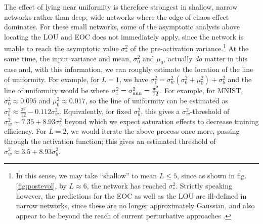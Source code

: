 The effect of lying near uniformity is therefore strongest in shallow, narrow networks rather than deep, wide networks where the edge of chaos effect dominates. For these small networks, some of the asymptotic analysis above locating the LOU and EOC does not immediately apply, since the network is unable to reach the asymptotic value $\sigma_{*}^{2}$ of the pre-activation variance.\footnote{In this sense, we may take ``shallow'' to mean $L \leq 5$, since as shown in fig. \ref{fig:postevol}, by $L \approx 6$, the network has reached $\sigma_{*}^{2}$. Strictly speaking however, the predictions for the EOC as well as the LOU are ill-defined in narrow networks, since these are no longer approximately Gaussian, and also appear to be beyond the reach of current perturbative approaches \cite{Grosvenor:2021eol}.} At the same time, the input variance and mean, $\sigma_{0}^{2}$ and $\mu_0$, actually \emph{do} matter in this case and, with this information, we can roughly estimate the location of the line of uniformity. For example, for $L=1$, we have $\sigma_{1}^{2} = \sigma_{w}^{2} ( \sigma_{0}^{2} + \mu_{0}^{2} ) + \sigma_{b}^{2}$ and the line of uniformity would be where $\sigma_{1}^{2} = \sigma_{{\rm min}}^{2} = \frac{\pi^2}{12}$. For example, for MNIST, $\sigma_0^2 \approx 0.095$ and $\mu_{0}^{2} \approx 0.017$, so the line of uniformity can be estimated as $\sigma_b^2 \approx \frac{\pi^2}{12} - 0.112 \sigma_w^2$. Equivalently, for fixed $\sigma_b^2$, this gives a $\sigma_{w}^{2}$-threshold of $\sigma_w^2 \sim 7.35 + 8.93 \sigma_b^2$ beyond which we expect saturation effects to decrease training efficiency. For $L=2$, we would iterate the above process once more, passing through the activation function; this gives an estimated threshold of $\sigma_{w}^{2} \approx 3.5 +8.93\sigma_b^2 $. 

